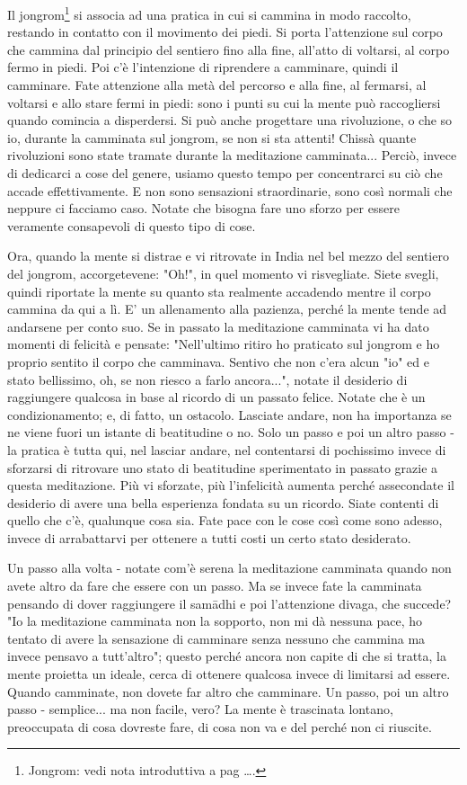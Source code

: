 
Il jongrom\footnote{Jongrom: vedi nota introduttiva a pag ….} si associa ad una pratica in cui si cammina in
modo raccolto, restando in contatto con il movimento dei piedi. Si porta
l'attenzione sul corpo che cammina dal principio del sentiero fino alla
fine, all'atto di voltarsi, al corpo fermo in piedi. Poi c'è
l'intenzione di riprendere a camminare, quindi il camminare. Fate
attenzione alla metà del percorso e alla fine, al fermarsi, al voltarsi
e allo stare fermi in piedi: sono i punti su cui la mente può
raccogliersi quando comincia a disperdersi. Si può anche progettare una
rivoluzione, o che so io, durante la camminata sul jongrom, se non si
sta attenti! Chissà quante rivoluzioni sono state tramate durante la
meditazione camminata... Perciò, invece di dedicarci a cose del genere,
usiamo questo tempo per concentrarci su ciò che accade effettivamente. E
non sono sensazioni straordinarie, sono così normali che neppure ci
facciamo caso. Notate che bisogna fare uno sforzo per essere veramente
consapevoli di questo tipo di cose.

Ora, quando la mente si distrae e vi ritrovate in India nel bel mezzo
del sentiero del jongrom, accorgetevene: "Oh!", in quel momento vi
risvegliate. Siete svegli, quindi riportate la mente su quanto sta
realmente accadendo mentre il corpo cammina da qui a lì. E' un
allenamento alla pazienza, perché la mente tende ad andarsene per conto
suo. Se in passato la meditazione camminata vi ha dato momenti di
felicità e pensate: "Nell'ultimo ritiro ho praticato sul jongrom e ho
proprio sentito il corpo che camminava. Sentivo che non c'era alcun "io"
ed e stato bellissimo, oh, se non riesco a farlo ancora...", notate il
desiderio di raggiungere qualcosa in base al ricordo di un passato
felice. Notate che è un condizionamento; e, di fatto, un ostacolo.
Lasciate andare, non ha importanza se ne viene fuori un istante di
beatitudine o no. Solo un passo e poi un altro passo - la pratica è
tutta qui, nel lasciar andare, nel contentarsi di pochissimo invece di
sforzarsi di ritrovare uno stato di beatitudine sperimentato in passato
grazie a questa meditazione. Più vi sforzate, più l'infelicità aumenta
perché assecondate il desiderio di avere una bella esperienza fondata su
un ricordo. Siate contenti di quello che c'è, qualunque cosa sia. Fate
pace con le cose così come sono adesso, invece di arrabattarvi per
ottenere a tutti costi un certo stato desiderato.

Un passo alla volta - notate com'è serena la meditazione camminata
quando non avete altro da fare che essere con un passo. Ma se invece
fate la camminata pensando di dover raggiungere il samādhi e poi
l'attenzione divaga, che succede? "Io la meditazione camminata non la
sopporto, non mi dà nessuna pace, ho tentato di avere la sensazione di
camminare senza nessuno che cammina ma invece pensavo a tutt'altro";
questo perché ancora non capite di che si tratta, la mente proietta un
ideale, cerca di ottenere qualcosa invece di limitarsi ad essere. Quando
camminate, non dovete far altro che camminare. Un passo, poi un altro
passo - semplice... ma non facile, vero? La mente è trascinata lontano,
preoccupata di cosa dovreste fare, di cosa non va e del perché non ci
riuscite.

